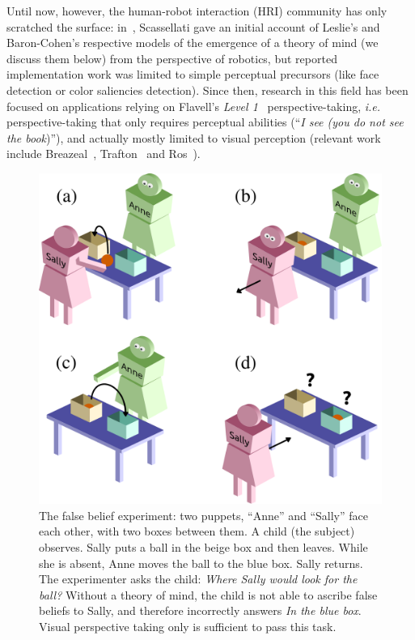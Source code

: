 \documentclass{sig-alternate}
\newcommand{\ie}{{\textit{i.e.~}}}
\begin{document}
Until now, however, the human-robot interaction (HRI) community has only
scratched the surface: in~\cite{scassellati2002theory}, Scassellati gave
an initial account of Leslie's and Baron-Cohen's respective models of the
emergence of a theory of mind (we discuss them below) from the perspective of
robotics, but reported implementation work was limited to simple perceptual
precursors (like face detection or color saliencies detection). Since then,
research in this field has been focused on applications relying on Flavell's
\emph{Level 1}~\cite{flavell1977development} perspective-taking, \ie
perspective-taking that only requires perceptual abilities (``\emph{I see (you do
not see the book})''), and actually mostly limited to visual perception (relevant
work include Breazeal~\cite{breazeal2006using}, Trafton~\cite{Trafton2005} and
Ros~\cite{Ros2010}).

\begin{figure}[h!t]
        \centering
        \includegraphics[width=0.7\linewidth]{sally_ann}
        \caption{\small The false belief experiment: two puppets, ``Anne'' and
            ``Sally'' face each other, with two boxes between them. A child (the
            subject) observes. Sally puts a ball in the beige box and then leaves.
            While she is absent, Anne moves the ball to the blue box. Sally
            returns. The experimenter asks the child: \emph{Where Sally would look
            for the ball?} Without a theory of mind, the child is not able
            to ascribe false beliefs to Sally, and therefore incorrectly answers
            \emph{In the blue box}. Visual perspective taking only is sufficient
            to pass this task.}

        \label{false-beliefs}
\end{figure}
\end{document}
